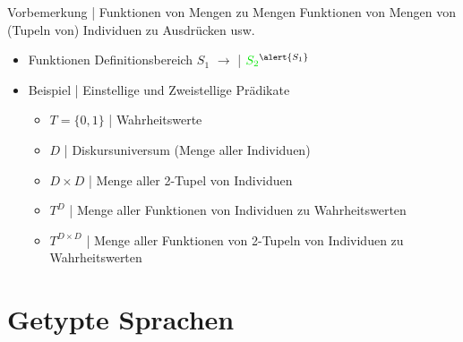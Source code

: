\begin{frame}
  {Vorbemerkung | Funktionen von Mengen zu Mengen}
  \onslide<+->
  \onslide<+->
  Funktionen von Mengen von (Tupeln von) Individuen zu Ausdrücken usw.\\
  \Halbzeile
  \begin{itemize}[<+->]
    \item Funktionen \alert{Definitionsbereich $S_1$} $\rightarrow$  | $\gruen{S_2}^{\alert{S_1}}$\\
      \Halbzeile
    \item Beispiel | Einstellige und Zweistellige Prädikate
      \begin{itemize}[<+->]
        \item $T=\{0,1\}$ | Wahrheitswerte
        \item $D$ | Diskursuniversum (Menge aller Individuen)
        \item $D\times D$ | Menge aller 2-Tupel von Individuen
          \Viertelzeile
        \item \alert{$T^D$} | Menge aller Funktionen von Individuen zu Wahrheitswerten\\
          \Viertelzeile
        \item \alert{$T^{D\times D}$} | Menge aller Funktionen von 2-Tupeln von Individuen zu Wahrheitswerten\\
      \end{itemize}
  \end{itemize}
\end{frame}

\section{Getypte Sprachen}


